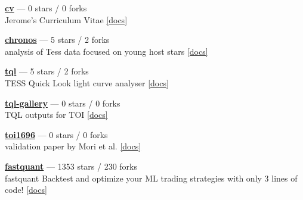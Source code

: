 \item \href{https://github.com/jpdeleon/cv}{{\bf cv}} --- 0 stars / 0 forks \\
Jerome's Curriculum Vitae \href{https://raw.githubusercontent.com/jpdeleon/cv/main-pdf/tex/cv_pubs.pdf}{[docs]}

\item \href{https://github.com/jpdeleon/chronos}{{\bf chronos}} --- 5 stars / 2 forks \\
analysis of Tess data focused on young host stars \href{None}{[docs]}

\item \href{https://github.com/jpdeleon/tql}{{\bf tql}} --- 5 stars / 2 forks \\
TESS Quick Look light curve analyser \href{None}{[docs]}

\item \href{https://github.com/jpdeleon/tql-gallery}{{\bf tql-gallery}} --- 0 stars / 0 forks \\
TQL outputs for TOI \href{None}{[docs]}

\item \href{https://github.com/jpdeleon/toi1696}{{\bf toi1696}} --- 0 stars / 0 forks \\
validation paper by Mori et al. \href{None}{[docs]}

\item \href{https://github.com/enzoampil/fastquant}{{\bf fastquant}} --- 1353 stars / 230 forks \\
fastquant {\textemdash} Backtest and optimize your ML trading strategies with only 3 lines of code! \href{}{[docs]}